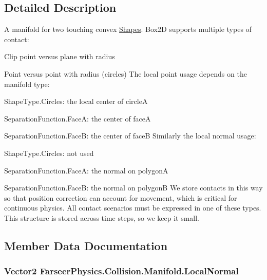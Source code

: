 \subsection{Detailed Description}
A manifold for two touching convex \hyperlink{namespace_farseer_physics_1_1_collision_1_1_shapes}{Shapes}. Box2\+D supports multiple types of contact\+: 


\begin{DoxyItemize}
\item Clip point versus plane with radius
\item Point versus point with radius (circles) The local point usage depends on the manifold type\+:
\item Shape\+Type.\+Circles\+: the local center of circle\+A
\item Separation\+Function.\+Face\+A\+: the center of face\+A
\item Separation\+Function.\+Face\+B\+: the center of face\+B Similarly the local normal usage\+:
\item Shape\+Type.\+Circles\+: not used
\item Separation\+Function.\+Face\+A\+: the normal on polygon\+A
\item Separation\+Function.\+Face\+B\+: the normal on polygon\+B We store contacts in this way so that position correction can account for movement, which is critical for continuous physics. All contact scenarios must be expressed in one of these types. This structure is stored across time steps, so we keep it small. 
\end{DoxyItemize}

\subsection{Member Data Documentation}
\hypertarget{struct_farseer_physics_1_1_collision_1_1_manifold_a49ad5b0ae45736b509d5445f8e04e823}{
\subsubsection[{Local\+Normal}]{\setlength{\rightskip}{0pt plus 5cm}Vector2 Farseer\+Physics.\+Collision.\+Manifold.\+Local\+Normal}}\label{struct_farseer_physics_1_1_collision_1_1_manifold_a49ad5b0ae45736b509d5445f8e04e823}


